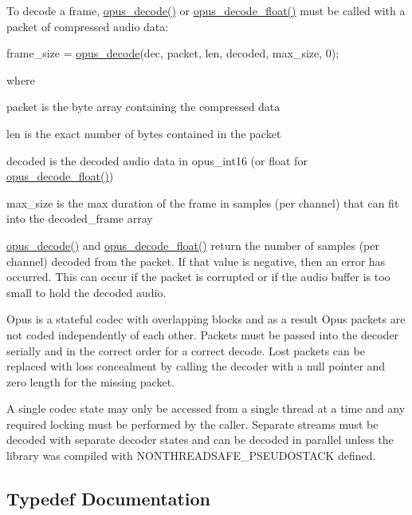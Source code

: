 To decode a frame, \hyperlink{group__opus__decoder_ga7d1111f64c36027ddcb81799df9b3fc9}{opus\+\_\+decode()} or \hyperlink{group__opus__decoder_ga9c554b8c0214e24733a299fe53bb3bd2}{opus\+\_\+decode\+\_\+float()} must be called with a packet of compressed audio data\+: 
\begin{DoxyCode}
frame\_size = \hyperlink{group__opus__decoder_ga7d1111f64c36027ddcb81799df9b3fc9}{opus\_decode}(dec, packet, len, decoded, max\_size, 0);
\end{DoxyCode}
 where

\begin{DoxyItemize}
\item packet is the byte array containing the compressed data \item len is the exact number of bytes contained in the packet \item decoded is the decoded audio data in opus\+\_\+int16 (or float for \hyperlink{group__opus__decoder_ga9c554b8c0214e24733a299fe53bb3bd2}{opus\+\_\+decode\+\_\+float()}) \item max\+\_\+size is the max duration of the frame in samples (per channel) that can fit into the decoded\+\_\+frame array\end{DoxyItemize}
\hyperlink{group__opus__decoder_ga7d1111f64c36027ddcb81799df9b3fc9}{opus\+\_\+decode()} and \hyperlink{group__opus__decoder_ga9c554b8c0214e24733a299fe53bb3bd2}{opus\+\_\+decode\+\_\+float()} return the number of samples (per channel) decoded from the packet. If that value is negative, then an error has occurred. This can occur if the packet is corrupted or if the audio buffer is too small to hold the decoded audio.

Opus is a stateful codec with overlapping blocks and as a result Opus packets are not coded independently of each other. Packets must be passed into the decoder serially and in the correct order for a correct decode. Lost packets can be replaced with loss concealment by calling the decoder with a null pointer and zero length for the missing packet.

A single codec state may only be accessed from a single thread at a time and any required locking must be performed by the caller. Separate streams must be decoded with separate decoder states and can be decoded in parallel unless the library was compiled with N\+O\+N\+T\+H\+R\+E\+A\+D\+S\+A\+F\+E\+\_\+\+P\+S\+E\+U\+D\+O\+S\+T\+A\+CK defined. 

\subsection{Typedef Documentation}
